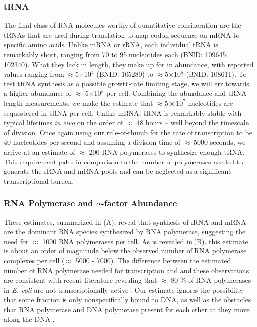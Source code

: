 \subsubsection{tRNA}
The final class of RNA molecules worthy of quantitative consideration are the
tRNAs that are used during translation to map codon sequence on mRNA to specific amino acids.
Unlike mRNA or rRNA, each individual tRNA is remarkably short, ranging
from 70 to 95 nucleotides each (BNID: 109645; 102340). What
they lack in length, they make up for in abundance, with reported values ranging from
$\approx$5$\times$10$^4$ (BNID: 105280) to
$\approx$5$\times$10$^5$ (BNID: 108611). To test tRNA synthesis as a possible
growth-rate limiting stage, we will err towards a higher abundance of $\approx$
5$\times$10$^5$ per cell. Combining the abundance and tRNA length measurements,
we make the estimate that $\approx 5 \times 10^7$ nucleotides are sequestered in tRNA per cell.
Unlike mRNA, tRNA is remarkably stable with typical lifetimes \textit{in vivo}
on the order of $\approx$ 48 hours \citep{abelson1974,svenningsen2017} -- well
beyond the timescale of division. Once again using our rule-of-thumb for the
rate of transcription to be 40 nucleotides per second and assuming a division
time of $\approx$ 5000 seconds, we arrive at an estimate of $\approx$ 200 RNA
polymerases to synthesize enough tRNA. This requirement pales in comparison to
the number of polymerases needed to generate the rRNA and mRNA pools and can be
neglected as a significant transcriptional burden.



\subsubsection{RNA Polymerase and $\sigma$-factor Abundance}
These estimates, summarized in  (A), reveal that synthesis of
rRNA  and mRNA are the dominant RNA species synthesized by RNA polymerase,
suggesting the need for $\approx$ 1000 RNA polymerases per cell. As is revealed
in  (B), this estimate is about an order of magnitude below
the observed number of RNA polymerase complexes per cell ($\approx$ 5000 -
7000). The difference between the estimated number of RNA polymerase needed for
transcription and and
these observations are consistent with recent literature revealing that
$\approx$ 80 \% of RNA polymerases in \textit{E. coli} are not transcriptionally
active \citep{patrick2015}. Our estimate ignores the possibility that some
fraction is only nonspecifically bound to DNA, as well as the obstacles that RNA
polymerase and DNA polymerase present for each other at they move along the DNA
\citep{finkelstein2013}.

